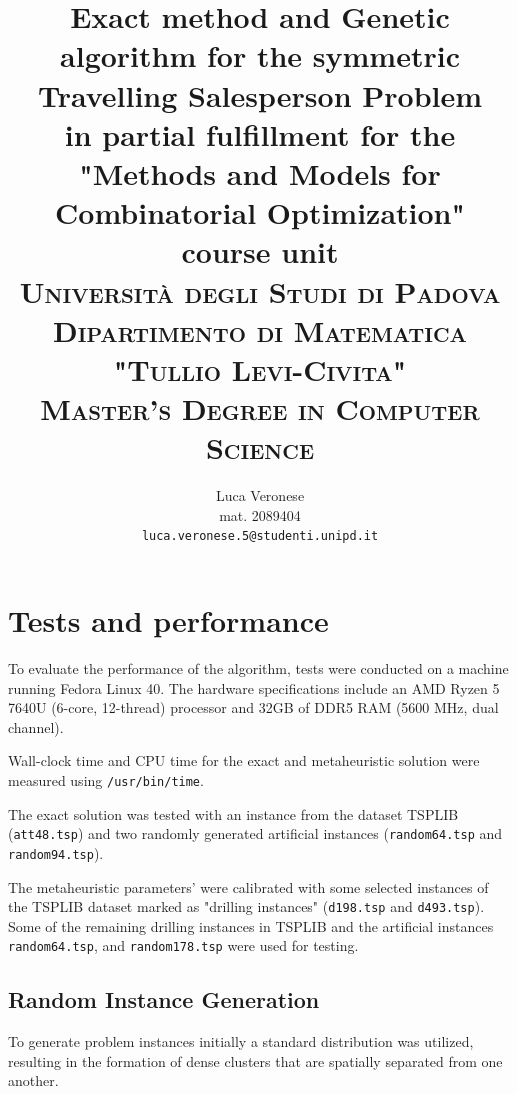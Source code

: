 \documentclass[11pt,letterpaper]{article}
\begin{document}
\title{
         Exact method and Genetic algorithm for the symmetric
Travelling Salesperson Problem\\
{\normalsize in partial fulfillment for the "Methods and Models for Combinatorial Optimization" course unit}\\  
        \textsc{\normalsize Università degli Studi di Padova\\ Dipartimento di Matematica "Tullio Levi-Civita"\\ Master's Degree in Computer Science}\\
        }

\author{Luca Veronese\\
mat. 2089404\\
{\tt\small luca.veronese.5@studenti.unipd.it}
}
\clearpage
\maketitle




\section{Tests and performance}
To evaluate the performance of the algorithm, tests were conducted on a machine running Fedora Linux 40. The hardware specifications include an AMD Ryzen 5 7640U (6-core, 12-thread) processor and 32GB of DDR5 RAM (5600 MHz, dual channel).

Wall-clock time and CPU time for the exact and metaheuristic solution were measured using \texttt{/usr/bin/time}.


The exact solution was tested with an instance from the dataset TSPLIB (\texttt{att48.tsp}) and two randomly generated artificial instances (\texttt{random64.tsp} and \texttt{random94.tsp}).

The metaheuristic parameters'  were calibrated with some selected instances of the TSPLIB dataset marked as "drilling instances" (\texttt{d198.tsp} and \texttt{d493.tsp}). Some of the remaining drilling instances in TSPLIB and the artificial instances \texttt{random64.tsp}, and \texttt{random178.tsp} were used for testing.
\subsection{Random Instance Generation}

To generate problem instances initially a standard distribution was utilized, resulting in the formation of dense clusters that are spatially separated from one another. 
\end{document}
